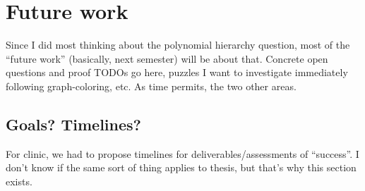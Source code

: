 \chapter{Future work}

\label{ch:future}

Since I did most thinking about the polynomial hierarchy question, most of the
``future work'' (basically, next semester) will be about that.  Concrete open
questions and proof TODOs go here, puzzles I want to investigate immediately
following graph-coloring, etc.  As time permits, the two other areas.

\section{Goals?  Timelines?}

For clinic, we had to propose timelines for deliverables/assessments of
``success''.  I don't know if the same sort of thing applies to thesis, but
that's why this section exists.


